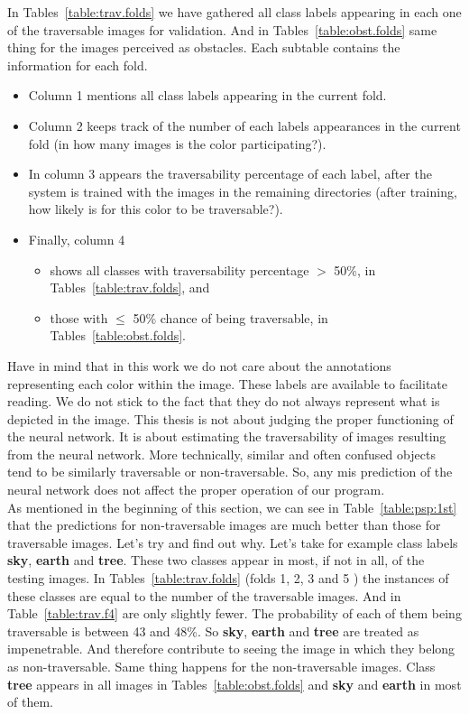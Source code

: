 \documentclass[12pt,a4paper,table,dvipsnames,tikz]{report}
\newcommand{\bl}[1]{{\hypersetup{linkcolor=blue}#1}}
\newcommand{\class}[1]{\textbf{\textcolor{#1}{#1}}} %
\begin{document}
	In Tables~\bl{\ref{table:trav.folds}} we have gathered all class labels appearing in each 
	one of the traversable images for validation. And in Tables~\bl{\ref{table:obst.folds}} 
	same thing for the images perceived as obstacles. Each subtable contains the information 
	for each fold. 
	\begin{itemize}
		\item Column 1 mentions all class labels appearing in the current fold.
		\item Column 2 keeps track of the number of each labels appearances in the current fold 
		(in how many images is the color participating?).
		\item In column 3 appears the traversability percentage of each label, after the system 
		is trained with the images in the remaining directories (after training, how likely is for 
		this color to be traversable?).
		\item Finally, column 4 
		\begin{itemize}
			\item shows all classes with traversability percentage $>$ 50\%, in 
			Tables~\bl{\ref{table:trav.folds}}, and
			\item those with $\le$ 50\% chance of being traversable, in 
			Tables~\bl{\ref{table:obst.folds}}.
		\end{itemize}
	\end{itemize}
	
	Have in mind that in this work we do not care about the annotations representing each 
	color within the image. These labels are available to facilitate reading. We do not 
	stick to the fact that they do not always represent what is depicted in the image. This 
	thesis is not about judging the proper functioning of the neural network. It is about 
	estimating the traversability of images resulting from the neural network. More technically, 
	similar and often confused objects tend to be similarly traversable or non-traversable. 
	So, any mis prediction of the neural network does not affect the proper operation of 
	our program.
	\\
	
	As mentioned in the beginning of this section, we can see in Table~\bl{\ref{table:psp:1st}} 
	that the predictions for non-traversable images are much better than those for 
	traversable images. Let's try and find out why. Let's take for example class labels 
	\class{sky}, \class{earth} and \class{tree}. These two classes appear in most, if not in 
	all, of the testing images. In Tables~\bl{\ref{table:trav.folds}} (folds 1, 2, 3 and 5 ) the 
	instances of these classes are equal to the number of the traversable images. And in 
	Table~\bl{\ref{table:trav.f4}} are only slightly fewer. The probability of each of them 
	being traversable is between 43 and 48\%. So \class{sky}, \class{earth} and \class{tree} 
	are treated as impenetrable. And therefore contribute to seeing the image in which they 
	belong as non-traversable. Same thing happens for the non-traversable images. Class 
	\class{tree} appears in all images in Tables~\bl{\ref{table:obst.folds}} and \class{sky} and 
	\class{earth} in most of them.
	\\
	
\end{document}
